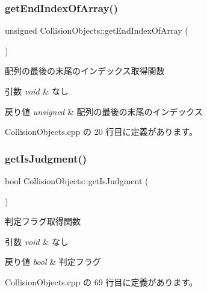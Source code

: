 \subsubsection{\texorpdfstring{get\+End\+Index\+Of\+Array()}{getEndIndexOfArray()}}
{\footnotesize\ttfamily unsigned Collision\+Objects\+::get\+End\+Index\+Of\+Array (\begin{DoxyParamCaption}{ }\end{DoxyParamCaption})}



配列の最後の末尾のインデックス取得関数 


\begin{DoxyParams}{引数}
{\em void} & なし \\
\hline
\end{DoxyParams}

\begin{DoxyRetVals}{戻り値}
{\em unsigned} & 配列の最後の末尾のインデックス \\
\hline
\end{DoxyRetVals}


 Collision\+Objects.\+cpp の 20 行目に定義があります。

\mbox{\label{class_collision_objects_a1320a57aae5798c04e65b2b7c8433aae}} 
\subsubsection{\texorpdfstring{get\+Is\+Judgment()}{getIsJudgment()}}
{\footnotesize\ttfamily bool Collision\+Objects\+::get\+Is\+Judgment (\begin{DoxyParamCaption}{ }\end{DoxyParamCaption})}



判定フラグ取得関数 


\begin{DoxyParams}{引数}
{\em void} & なし \\
\hline
\end{DoxyParams}

\begin{DoxyRetVals}{戻り値}
{\em bool} & 判定フラグ \\
\hline
\end{DoxyRetVals}


 Collision\+Objects.\+cpp の 69 行目に定義があります。

